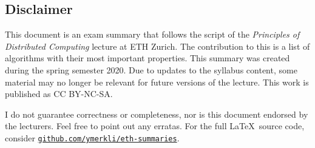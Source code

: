 \documentclass{article}
\begin{document}
	
\begin{multicols*}{3}
	
\section*{Disclaimer}

This document is an exam summary that follows the script of the \textit{Principles of Distributed Computing} lecture  at ETH Zurich. The contribution to this is a list of algorithms with their most important properties. This summary was created during the spring semester 2020. Due to updates to the syllabus content, some material may no longer be relevant for future versions of the lecture. This work is published as CC BY-NC-SA.

\begin{center}
	\ccbyncsa
\end{center}

\noindent I do not guarantee correctness or completeness, nor is this document endorsed by the lecturers. Feel free to point out any erratas. For the full \LaTeX \ source code, consider \texttt{\href{https://github.com/ymerkli/eth-summaries}{github.com/ymerkli/eth-summaries}}.

\end{multicols*}

\newpage
	
\end{document}
